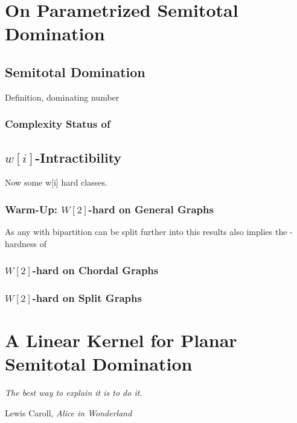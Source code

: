 \chapter{On Parametrized Semitotal Domination}
\section{Semitotal Domination}

\sdom

Definition, dominating number

\subsection*{Complexity Status of \sdom}

\section{\hmath $w[i]$-Intractibility}

Now some  w[i] hard classes. 

\subsection{Warm-Up: \hmath $W[2]$-hard on General Graphs}


As any \bg with bipartition can be split further into \rpg this results also implies the \wone-hardness of \rpg



\subsection{\hmath $W[2]$-hard on Chordal Graphs}

\subsection{\hmath $W[2]$-hard on Split Graphs}

\chapter{A Linear Kernel for Planar Semitotal Domination}

\epigraph{\itshape The best way to explain it is to do it.}{Lewis Caroll, \textit{Alice in Wonderland}}

